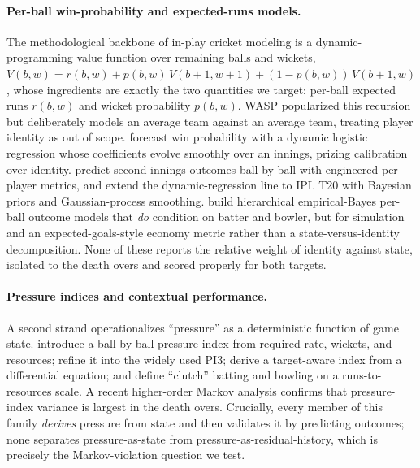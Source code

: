 \paragraph{Per-ball win-probability and expected-runs models.}
The methodological backbone of in-play cricket modeling is a dynamic-programming
value function over remaining balls and wickets, $V(b,w) = r(b,w) + p(b,w)\,
V(b{+}1,w{+}1) + (1{-}p(b,w))\,V(b{+}1,w)$, whose ingredients are exactly the two
quantities we target: per-ball expected runs $r(b,w)$ and wicket probability
$p(b,w)$. WASP \citep{brooker2012wasp} popularized this recursion but
deliberately models an average team against an average team, treating player
identity as out of scope. \citet{asif2016inplay} forecast win probability with a
dynamic logistic regression whose coefficients evolve smoothly over an innings,
prizing calibration over identity. \citet{davis2021dynamic} predict
second-innings outcomes ball by ball with engineered per-player metrics, and
\citet{lamsal2024ingame} extend the dynamic-regression line to IPL T20 with
Bayesian priors and Gaussian-process smoothing. \citet{swartz2016simulator,
swartz2020xer} build hierarchical empirical-Bayes per-ball outcome models that
\emph{do} condition on batter and bowler, but for simulation and an
expected-goals-style economy metric rather than a state-versus-identity
decomposition. None of these reports the relative weight of identity against
state, isolated to the death overs and scored properly for both targets.

\paragraph{Pressure indices and contextual performance.}
A second strand operationalizes ``pressure'' as a deterministic function of game
state. \citet{shah2014pressure} introduce a ball-by-ball pressure index from
required rate, wickets, and resources; \citet{bhattacharjee2016quantifying}
refine it into the widely used PI3; \citet{mallawa2024pressure} derive a
target-aware index from a differential equation; and
\citet{thomson2021contextual} define ``clutch'' batting and bowling on a
runs-to-resources scale. A recent higher-order Markov analysis
\citep{arxiv2025markov} confirms that pressure-index variance is largest in the
death overs. Crucially, every member of this family \emph{derives} pressure from
state and then validates it by predicting outcomes; none separates
pressure-as-state from pressure-as-residual-history, which is precisely the
Markov-violation question we test.

